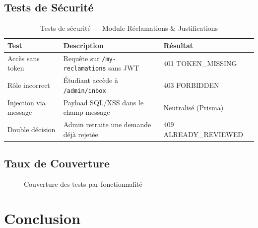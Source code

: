 \subsection{Tests de Sécurité}

\begin{table}[H]
\centering
\caption{Tests de sécurité — Module Réclamations \& Justifications}
\begin{tabularx}{\linewidth}{@{}lLl@{}}
\toprule
\textbf{Test} & \textbf{Description} & \textbf{Résultat} \\
\midrule
Accès sans token &
  Requête sur \texttt{/my-reclamations} sans JWT &
  401 TOKEN\_MISSING \\
Rôle incorrect &
  Étudiant accède à \texttt{/admin/inbox} &
  403 FORBIDDEN \\
Injection via message &
  Payload SQL/XSS dans le champ message &
  Neutralisé (Prisma) \\
Double décision &
  Admin retraite une demande déjà rejetée &
  409 ALREADY\_REVIEWED \\
\bottomrule
\end{tabularx}
\end{table}

\subsection{Taux de Couverture}

\begin{figure}[H]
\centering
{}
\caption{Couverture des tests par fonctionnalité}
\label{fig:rj_coverage}
\end{figure}

\section{Conclusion}

